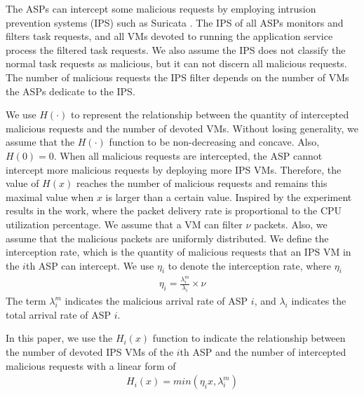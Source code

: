 \documentclass[10pt,journal, compsoc]{IEEEtran}
\begin{document}
The ASPs can intercept some malicious requests by employing intrusion prevention systems (IPS) such as Suricata \cite{Suricata}. The IPS of all ASPs monitors and filters task requests, and all VMs devoted to running the application service process the filtered task requests. We also assume the IPS does not classify the normal task requests as malicious, but it can not discern all malicious requests. The number of malicious requests the IPS filter depends on the number of VMs the ASPs dedicate to the IPS. 

We use $H(\cdot)$ to represent the relationship between the quantity of intercepted malicious requests and the number of devoted VMs. Without losing generality, we assume that the $H(\cdot)$ function to be non-decreasing and concave. Also, $H(0)=0$. When all malicious requests are intercepted, the ASP cannot intercept more malicious requests by deploying more IPS VMs. Therefore, the value of $H(x)$ reaches the number of malicious requests and remains this maximal value when $x$ is larger than a certain value. Inspired by the experiment results in the work\cite{chi}, where the packet delivery rate is proportional to the CPU utilization percentage. We assume that a VM can filter $\nu$ packets. Also, we assume that the malicious packets are uniformly distributed. We define the interception rate, which is the quantity of malicious requests that an IPS VM in the $i$th ASP can intercept. We use $\eta_i$ to denote the interception rate, where $\eta_i$
\begin{equation}
   \begin{aligned}
    \eta_i = \frac{\lambda_i^m}{\lambda_i} \times \nu
    \end{aligned} 
\end{equation}
The term $\lambda_i^m$ indicates the malicious arrival rate of ASP $i$, and $\lambda_i$ indicates the total arrival rate of ASP $i$.

In this paper, we use the $H_i(x)$ function to indicate the relationship between the number of devoted IPS VMs of the $i$th ASP and the number of intercepted malicious requests with a linear form of
\begin{equation}
\begin{aligned}
    H_i(x) = min(\eta_i{x}, \lambda_i^m)
\end{aligned}
\end{equation}
\end{document}

